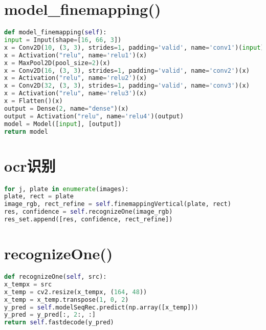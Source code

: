 \section{model\_finemapping()}\label{apdx:model_finemapping}
\begin{lstlisting}[language=python]
def model_finemapping(self):
input = Input(shape=[16, 66, 3])
x = Conv2D(10, (3, 3), strides=1, padding='valid', name='conv1')(input)
x = Activation("relu", name='relu1')(x)
x = MaxPool2D(pool_size=2)(x)
x = Conv2D(16, (3, 3), strides=1, padding='valid', name='conv2')(x)
x = Activation("relu", name='relu2')(x)
x = Conv2D(32, (3, 3), strides=1, padding='valid', name='conv3')(x)
x = Activation("relu", name='relu3')(x)
x = Flatten()(x)
output = Dense(2, name="dense")(x)
output = Activation("relu", name='relu4')(output)
model = Model([input], [output])
return model
\end{lstlisting}

\section{ocr识别}\label{apdx:ocr}
\begin{lstlisting}[language=python]
for j, plate in enumerate(images):
plate, rect = plate
image_rgb, rect_refine = self.finemappingVertical(plate, rect)
res, confidence = self.recognizeOne(image_rgb)
res_set.append([res, confidence, rect_refine])
\end{lstlisting}

\section{recognizeOne()}\label{apdx:recognizeOne}
\begin{lstlisting}[language=python]
def recognizeOne(self, src):
x_tempx = src
x_temp = cv2.resize(x_tempx, (164, 48))
x_temp = x_temp.transpose(1, 0, 2)
y_pred = self.modelSeqRec.predict(np.array([x_temp]))
y_pred = y_pred[:, 2:, :]
return self.fastdecode(y_pred)
\end{lstlisting}

